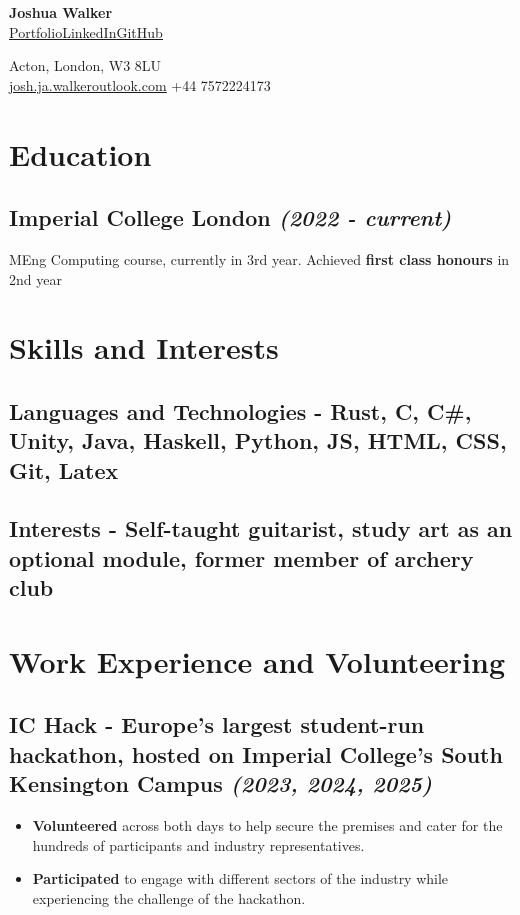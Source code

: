 \documentclass{article}
\makeatletter
\newcommand{\contact}[1]{\normalsize{#1}}
\newcommand{\contactdiv}{\hspace*{0.8em}}
\newcommand{\email}[2]{\href{mailto:#1@#2}{\underline{#1{\small\fontfamily{phv}\selectfont@}#2}}}
\newcommand{\linkedin}{\href{https://www.linkedin.com/in/joshua-walker-080714238/}{\underline{LinkedIn}}}
\newcommand{\github}{\href{https://github.com/josh-ja-walker}{\underline{GitHub}}}
\newcommand{\portfolio}{\href{https://josh-ja-walker.github.io/portfolio/}{\underline{Portfolio}}}
\newcommand{\dates}[1]{\hfill\textit{(#1)}}
\newcommand{\indentsubsection}[2]{
    \subsection*{#1}
    #2
}
\makeatother
\begin{document}
\begin{multicols}{2}

    \begin{flushleft}
        {\LARGE\textbf{Joshua Walker}}\\
        \vspace{0.5em}
        \portfolio\contactdiv\linkedin\contactdiv\github
    \end{flushleft}
    
    \columnbreak
    
    \begin{flushright}
        \contact{Acton, London, W3 8LU}\\
        \vspace{0.5em}
        \contact{\email{josh.ja.walker}{outlook.com}}
        \contactdiv
        \contact{+44 7572224173}
    \end{flushright}
    
\end{multicols}

\section*{Education}

\indentsubsection{\textbf{Imperial College London} \dates{2022 - current}}{
    MEng Computing course, currently in 3rd year. Achieved \textbf{first class honours} in 2nd year
}


\section*{Skills and Interests}

\indentsubsection{\textbf{Languages and Technologies} - Rust, C, C\#, Unity, Java, Haskell, Python, JS, HTML, CSS, Git, Latex}{}
\indentsubsection{\textbf{Interests} - Self-taught guitarist, study art as an optional module, former member of archery club}{}

\vspace{0.5em}


\section*{Work Experience and Volunteering}

\indentsubsection{\textbf{IC Hack} - Europe's largest student-run hackathon, hosted on Imperial College's South Kensington Campus \dates{2023, 2024, 2025}}{
    \begin{itemize}[topsep=0pt, itemsep=0.05em]
        \item\textbf{Volunteered} across both days to help secure the premises and cater for the hundreds of participants and industry representatives.
        \item\textbf{Participated} to engage with different sectors of the industry while experiencing the challenge of the hackathon.
    \end{itemize}
}
\end{document}
